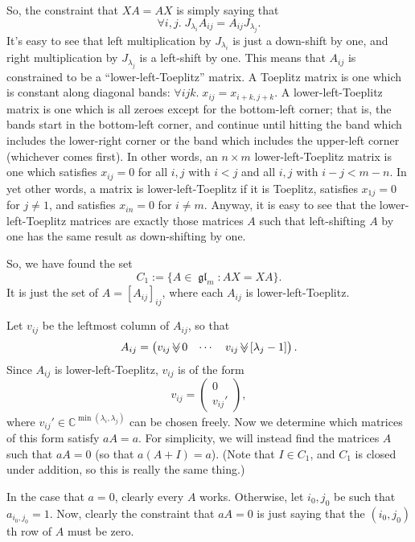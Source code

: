 \documentclass[12pt,psamsfonts]{article}
\newcommand{\downshift}{\mathbin{\rotatebox[origin=c]{90}{$\ll$}}}
\DeclareMathOperator{\gl}{\mathfrak{gl}}
\begin{document}
So, the constraint that \(XA = AX\) is simply saying that 
\[\forall i,j. \; J_{\lambda_i} A_{ij} = A_{ij} J_{\lambda_j}.\]
It's easy to see that left multiplication by \(J_{\lambda_i}\) is just a down-shift by one, and right multiplication by \(J_{\lambda_j}\) is a left-shift by one.
This means that \(A_{ij}\) is constrained to be a ``lower-left-Toeplitz'' matrix.
A Toeplitz matrix is one which is constant along diagonal bands: \(\forall ijk. \; x_{ij} = x_{i + k,j + k}\).
A lower-left-Toeplitz matrix is one which is all zeroes except for the bottom-left corner; that is, the bands start in the bottom-left corner, and continue until hitting the band which includes the lower-right corner or the band which includes the upper-left corner (whichever comes first).
In other words, an \(n \times m\) lower-left-Toeplitz matrix is one which satisfies \(x_{ij} = 0\) for all \(i,j\) with \(i < j\) and all \(i,j\) with \(i - j < m - n\).
In yet other words, a matrix is lower-left-Toeplitz if it is Toeplitz, satisfies \(x_{1j} = 0\) for \(j \neq 1\), and satisfies \(x_{in} = 0\) for \(i \neq m\).
Anyway, it is easy to see that the lower-left-Toeplitz matrices are exactly those matrices \(A\) such that left-shifting \(A\) by one has the same result as down-shifting by one.
\par So, we have found the set 
\[C_1 := \{A \in \gl_m : AX = XA\}.\]
It is just the set of \(A = [A_{ij}]_{ij}\), where each \(A_{ij}\) is lower-left-Toeplitz.
\par Let \(v_{ij}\) be the leftmost column of \(A_{ij}\), so that
\[A_{ij} = \begin{pmatrix}
    v_{ij} \downshift 0 & \cdots & v_{ij} \downshift [\lambda_j - 1]
\end{pmatrix}.\]
Since \(A_{ij}\) is lower-left-Toeplitz, \(v_{ij}\) is of the form 
\[v_{ij} = \begin{pmatrix}
    0\\
    v_{ij}'
\end{pmatrix},\]
where \(v_{ij}' \in \mathbb{C}^{\min(\lambda_i, \lambda_j)}\) can be chosen freely.
Now we determine which matrices of this form satisfy \(aA = a\).
For simplicity, we will instead find the matrices \(A\) such that \(aA = 0\) (so that \(a(A + I) = a\)).
(Note that \(I \in C_1\), and \(C_1\) is closed under addition, so this is really the same thing.)
\par In the case that \(a = 0\), clearly every \(A\) works.
Otherwise, let \(i_0, j_0\) be such that \(a_{i_0,j_0} = 1\).
Now, clearly the constraint that \(aA = 0\) is just saying that the \((i_0,j_0)\)th row of \(A\) must be zero.
\end{document}
